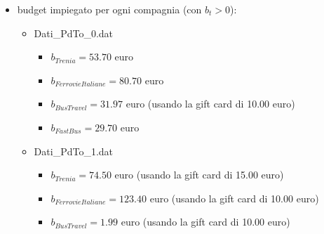 \documentclass[main.tex]{subfiles}
\begin{document}
\begin{itemize}
\begin{itemize}
    \end{itemize}
    \item budget impiegato per ogni compagnia (con $b_t > 0$):
    \begin{itemize}
        \item Dati\_PdTo\_0.dat
        \begin{itemize}
            \item $b_{Trenia} = 53.70$ euro
            \item $b_{FerrovieItaliane} = 80.70$ euro
            \item $b_{BusTravel} = 31.97$ euro (usando la gift card di 10.00 euro)
            \item $b_{FastBus} = 29.70$ euro
        \end{itemize}
        \item Dati\_PdTo\_1.dat
        \begin{itemize}
            \item $b_{Trenia} = 74.50$ euro (usando la gift card di 15.00 euro)
            \item $b_{FerrovieItaliane} = 123.40$ euro (usando la gift card di 10.00 euro)
            \item $b_{BusTravel} = 1.99$ euro (usando la gift card di 10.00 euro)
        \end{itemize}
    \end{itemize}
\end{itemize}
\end{document}
